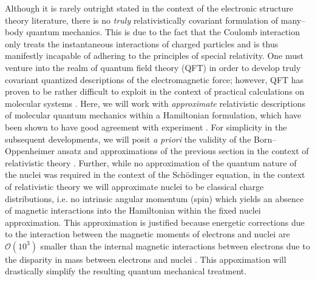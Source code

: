 Although it is rarely outright stated in the context of the electronic structure theory
literature, there is no \emph{truly} relativistically covariant formulation of many--body quantum 
mechanics. This is due to the fact that the Coulomb interaction only treats the instantaneous interactions
of charged particles and is thus manifestly incapable of adhering to the principles of special relativity.
One must venture into the realm of quantum field theory (QFT) in order to develop truly covariant quantized 
descriptions of the electromagnetic force; however, QFT has proven to be rather difficult to exploit in
the context of practical calculations on molecular systems . Here, we will work with
\emph{approximate} relativistic descriptions of molecular quantum mechanics within a Hamiltonian
formulation, which have been shown to have good agreement with experiment .
For simplicity in the subsequent developments, we will posit \emph{a priori} the validity of the 
Born--Oppenheimer ansatz and approximations of the previous section in the context of relativistic
theory . Further, while no approximation of the quantum nature of the nuclei was required in the 
context of the Sch\"{o}dinger equation, in the context of relativistic theory we will approximate
nuclei to be classical charge distributions, i.e. no intrinsic angular momentum (spin) which
yields an absence of magnetic interactions into the Hamiltonian within the fixed nuclei approximation.
This approximation is justified because energetic corrections due to the interaction between
the magnetic moments of electrons and nuclei are $\mathcal{O}(10^3)$ smaller than the internal
magnetic interactions between electrons due to the disparity in mass between electrons and nuclei .
This appoximation will drastically simplify the resulting quantum mechanical treatment.

